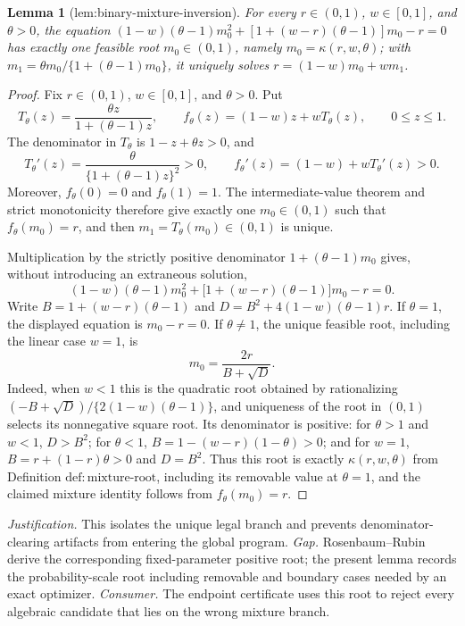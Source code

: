 \documentclass{article}
\newtheorem{lemma}{Lemma}
\begin{document}
\begin{lemma}[lem:binary-mixture-inversion]\label{lem:binary-mixture-inversion}
For every \(r\in(0,1)\), \(w\in[0,1]\), and \(\theta>0\), the equation \((1-w)(\theta-1)m_0^2+[1+(w-r)(\theta-1)]m_0-r=0\) has exactly one feasible root \(m_0\in(0,1)\), namely \(m_0=\kappa(r,w,\theta)\); with \(m_1=\theta m_0/\{1+(\theta-1)m_0\}\), it uniquely solves \(r=(1-w)m_0+wm_1\).
\end{lemma}
\begin{proof}
Fix \(r\in(0,1)\), \(w\in[0,1]\), and \(\theta>0\).  Put
\[
T_\theta(z)=\frac{\theta z}{1+(\theta-1)z},\qquad
f_\theta(z)=(1-w)z+wT_\theta(z),\qquad 0\leq z\leq1.
\]
The denominator in \(T_\theta\) is \(1-z+\theta z>0\), and
\[
T_\theta'(z)=\frac{\theta}{\{1+(\theta-1)z\}^2}>0,\qquad
f_\theta'(z)=(1-w)+wT_\theta'(z)>0.
\]
Moreover, \(f_\theta(0)=0\) and \(f_\theta(1)=1\).  The intermediate-value theorem and strict monotonicity therefore give exactly one \(m_0\in(0,1)\) such that \(f_\theta(m_0)=r\), and then \(m_1=T_\theta(m_0)\in(0,1)\) is unique.

Multiplication by the strictly positive denominator \(1+(\theta-1)m_0\) gives, without introducing an extraneous solution,
\[
(1-w)(\theta-1)m_0^2+\bigl[1+(w-r)(\theta-1)\bigr]m_0-r=0.
\]
Write \(B=1+(w-r)(\theta-1)\) and \(D=B^2+4(1-w)(\theta-1)r\).  If \(\theta=1\), the displayed equation is \(m_0-r=0\).  If \(\theta\neq1\), the unique feasible root, including the linear case \(w=1\), is
\[
m_0=\frac{2r}{B+\sqrt D}.
\]
Indeed, when \(w<1\) this is the quadratic root obtained by rationalizing \((-B+\sqrt D)/\{2(1-w)(\theta-1)\}\), and uniqueness of the root in \((0,1)\) selects its nonnegative square root.  Its denominator is positive: for \(\theta>1\) and \(w<1\), \(D>B^2\); for \(\theta<1\), \(B=1-(w-r)(1-\theta)>0\); and for \(w=1\), \(B=r+(1-r)\theta>0\) and \(D=B^2\).  Thus this root is exactly \(\kappa(r,w,\theta)\) from Definition \(\mathrm{def{:}mixture\text{-}root}\), including its removable value at \(\theta=1\), and the claimed mixture identity follows from \(f_\theta(m_0)=r\).
\end{proof}
\par\smallskip\noindent \textit{Justification.} This isolates the unique legal branch and prevents denominator-clearing artifacts from entering the global program. \textit{Gap.} Rosenbaum--Rubin derive the corresponding fixed-parameter positive root; the present lemma records the probability-scale root including removable and boundary cases needed by an exact optimizer. \textit{Consumer.} The endpoint certificate uses this root to reject every algebraic candidate that lies on the wrong mixture branch.
\end{document}

